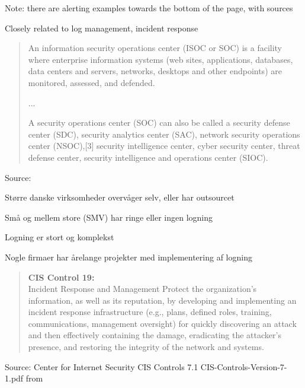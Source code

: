 \documentclass[Screen16to9,17pt]{foils}
\begin{document}
\begin{list2}
  \item Note: there are alerting examples towards the bottom of the page, with sources
  \item Closely related to log management, incident response
\end{list2}




\begin{quote}
An information security operations center (ISOC or SOC) is a facility where enterprise information systems (web sites, applications, databases, data centers and servers, networks, desktops and other endpoints) are monitored, assessed, and defended.

...

A security operations center (SOC) can also be called a security defense center (SDC), security analytics center (SAC), network security operations center (NSOC),[3] security intelligence center, cyber security center, threat defense center, security intelligence and operations center (SIOC).
\end{quote}
Source: 


\begin{list2}
\item Større danske virksomheder overvåger selv, eller har outsourcet
\item Små og mellem store (SMV) har ringe eller ingen logning
\end{list2}




\begin{list2}
\item Logning er stort og komplekst
\item Nogle firmaer har årelange projekter med implementering af logning
\end{list2}




\begin{quote}{\bf
CIS Control 19:}\\
Incident Response and Management Protect the organization’s information, as well as its reputation, by developing and implementing an incident response infrastructure (e.g., plans, defined roles, training, communications, management oversight) for quickly discovering an attack and then effectively containing the damage, eradicating the attacker’s presence, and restoring the integrity of the network and systems.
\end{quote}

Source:
Center for Internet Security CIS Controls 7.1 CIS-Controls-Version-7-1.pdf
from 
\end{document}
